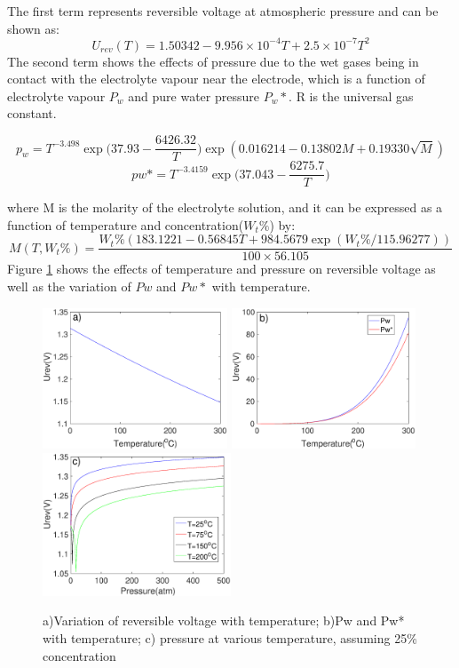 The first term represents reversible voltage at atmospheric pressure and can be shown as:\cite{reversible}
\begin{equation} 
U_{rev}(T)=1.50342-9.956 \times 10^{-4}T+2.5 \times10^{-7}T^2
\end{equation} 
 The second term shows the effects of pressure due to the wet gases being in contact with the electrolyte vapour near the electrode, which is a function of electrolyte vapour $P_w$ and pure water pressure $P_w*$. R is the universal gas constant.\cite{reversible}
 \begin{singlespace}

 \begin{equation} 
p_w=T^{-3.498} \exp\bigg(37.93-\frac{6426.32} {T} \bigg)\exp(0.016214 - 0.13802M+0.19330\sqrt{M} ) 
\end{equation} 
\begin{equation}
pw*=T^{-3.4159} \exp\bigg(37.043-\frac{6275.7} {T} \bigg) 
\end{equation} 
\end{singlespace}
where M is the molarity of the electrolyte solution, and it can be expressed as a function of temperature and  concentration($W_t\%$) by:\cite{reversible}
\begin{equation} 
M(T, W_t\%) =\frac{W_t\%(183.1221-0.56845T+984.5679 \exp(W_t\%/115.96277))} {100\times56.105} 
\end{equation} 
Figure \ref{fig:Urev} shows the effects of temperature and pressure on reversible voltage as well as the variation of $Pw$ and $Pw*$ with temperature. 
\begin{figure} 
\includegraphics[width=5.5cm]{temperature.eps} 
\includegraphics[width=5.5cm]{pw.eps} 
\includegraphics[width=5.6cm] {pressure.eps} 
\caption{a)Variation of reversible voltage with temperature; b)Pw and Pw* with temperature; c) pressure at various temperature, assuming 25\% concentration} 
\label{fig:Urev}
\end{figure} 
